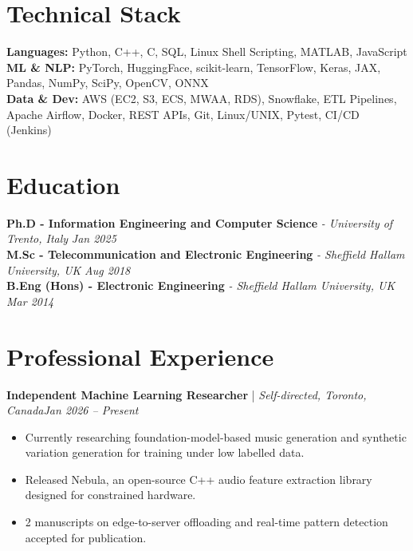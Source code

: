 \documentclass[11pt]{article}
\newenvironment{cvrole}[5]{%
  \par\noindent\textbf{#1} | \textit{\small #2, #3}\hfill \textit{\small #4 -- #5}\par
  \begin{itemize}[leftmargin=1.4em, itemsep=-0.3em, topsep=-0.15em]%
}{%
  \end{itemize}\par\noindent\mbox{}\par\vspace{-0.55em}%
}
\begin{document}
\section*{Technical Stack}

\textbf{Languages:} Python, C++, C, SQL, Linux Shell Scripting, MATLAB, JavaScript\\
\textbf{ML \& NLP:} PyTorch, HuggingFace, scikit-learn, TensorFlow, Keras, JAX, Pandas, NumPy, SciPy, OpenCV, ONNX\\
\textbf{Data \& Dev:} AWS (EC2, S3, ECS, MWAA, RDS), Snowflake, ETL Pipelines, Apache Airflow, Docker, REST APIs, Git, Linux/UNIX, Pytest, CI/CD (Jenkins)

\section*{Education}
\textbf{Ph.D - Information Engineering and Computer Science} \textit{\small{ - University of Trento, Italy}} \hfill \textit{Jan 2025}\\[1pt]
\noindent\textbf{M.Sc - Telecommunication and Electronic Engineering} \textit{\small{ - Sheffield Hallam University, UK}} \hfill \textit{Aug 2018}\\[1pt]
\noindent\textbf{B.Eng (Hons) - Electronic Engineering} \textit{\small{ - Sheffield Hallam University, UK}} \hfill \textit{Mar 2014}

\section*{Professional Experience}

\begin{cvrole}{Independent Machine Learning Researcher}{Self-directed}{Toronto, Canada}{Jan 2026}{Present}
    \item Currently researching foundation-model-based music generation and synthetic variation generation for training under low labelled data.
    \item Released Nebula, an open-source C++ audio feature extraction library designed for constrained hardware.
    \item 2 manuscripts on edge-to-server offloading and real-time pattern detection accepted for publication.
\end{cvrole}
\end{document}

